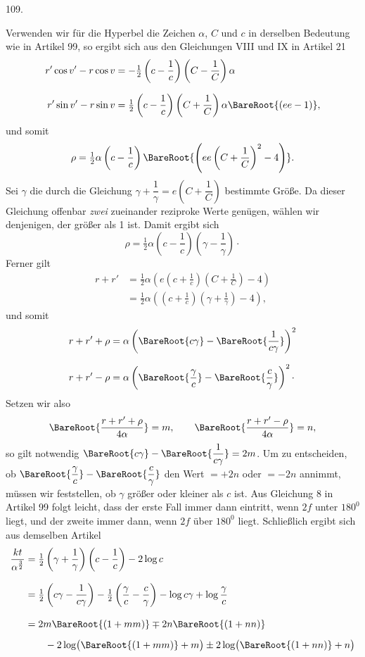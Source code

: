 \par{}\medskip
\hypertarget{native-151-article109}{}
\begin{center}109.\end{center}
Verwenden wir für die Hyperbel die Zeichen $\alpha$, $C$ und $c$ in derselben Bedeutung wie in Artikel 99, so ergibt sich aus den Gleichungen VIII und IX in Artikel 21
\[
\begin{aligned}
r'\cos v'-r\cos v&=-\tfrac12\left(c-\frac1c\right)\left(C-\frac1C\right)\alpha\\[.7em]
r'\sin v'-r\sin v&=\tfrac12\left(c-\frac1c\right)\left(C+\frac1C\right)\alpha\BareRoot{(ee-1)},
\end{aligned}
\]
\noindent und somit
\[
\rho=\tfrac12\alpha\left(c-\frac1c\right)\BareRoot{\left(ee\left(C+\frac1C\right)^2-4\right)}.
\]
\noindent{}Sei $\gamma$ die durch die Gleichung $\gamma+\dfrac1\gamma=e\left(C+\dfrac1C\right)$ bestimmte Größe. Da dieser Gleichung offenbar \emph{zwei} zueinander reziproke Werte genügen, wählen wir denjenigen, der größer als 1 ist. Damit ergibt sich
\[
\rho=\tfrac12\alpha\left(c-\frac1c\right)\left(\gamma-\frac1\gamma\right)\mathpunct{\cdot}
\]
\noindent Ferner gilt
\[
\begin{aligned}
r+r'&=\tfrac12\alpha\left(e\left(c+\frac1c\right)\left(C+\frac1C\right)-4\right)\\[.7em]
&=\tfrac12\alpha\left(\left(c+\frac1c\right)\left(\gamma+\frac1\gamma\right)-4\right),
\end{aligned}
\]
\noindent und somit
\[
\begin{aligned}
r+r'+\rho&=\alpha\left(\BareRoot{c\gamma}-\BareRoot{\frac1{c\gamma}}\right)^2\\[.7em]
r+r'-\rho&=\alpha\left(\BareRoot{\frac\gamma c}-\BareRoot{\frac c\gamma}\right)^2\mathpunct{\cdot}
\end{aligned}
\]
\noindent Setzen wir also
\[
\BareRoot{\frac{r+r'+\rho}{4\alpha}}=m,\qquad\BareRoot{\frac{r+r'-\rho}{4\alpha}}=n,
\]
\noindent so gilt notwendig $\BareRoot{c\gamma}-\BareRoot{\dfrac1{c\gamma}}=2m$. Um zu entscheiden, ob $\BareRoot{\dfrac\gamma c}-\BareRoot{\dfrac c\gamma}$ den Wert $=+2n$ oder $=-2n$ annimmt, müssen wir feststellen, ob $\gamma$ größer oder kleiner als $c$ ist. Aus Gleichung 8 in Artikel 99 folgt leicht, dass der erste Fall immer dann eintritt, wenn $2f$ unter $180^0$ liegt, und der zweite immer dann, wenn $2f$ über $180^0$ liegt. Schließlich ergibt sich aus demselben Artikel
\[
\begin{aligned}
\frac{kt}{\alpha^{\frac32}}&=\tfrac12\left(\gamma+\frac1\gamma\right)\left(c-\frac1c\right)-2\log c\\[.8em]
&=\tfrac12\left(c\gamma-\frac1{c\gamma}\right)-\tfrac12\left(\frac\gamma c-\frac c\gamma\right)-\log c\gamma+\log\frac\gamma c\\[.8em]
&=2m\BareRoot{(1+mm)}\mp2n\BareRoot{(1+nn)}\\[.5em]
&\qquad-2\log\bigl(\BareRoot{(1+mm)}+m\bigr)\pm2\log\bigl(\BareRoot{(1+nn)}+n\bigr)
\end{aligned}
\]

